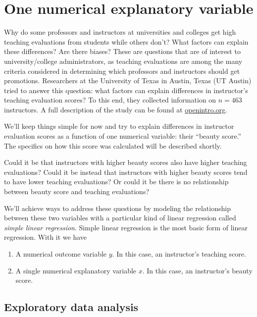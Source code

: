 \documentclass[
  letterpaper,
  DIV=11,
  numbers=noendperiod]{scrreprt}
\theoremstyle{definition}
\theoremstyle{remark}
\begin{document}
\hypertarget{sec-model1}{%
\section{One numerical explanatory variable}\label{sec-model1}}

Why do some professors and instructors at universities and colleges get
high teaching evaluations from students while others don't? What factors
can explain these differences? Are there biases? These are questions
that are of interest to university/college administrators, as teaching
evaluations are among the many criteria considered in determining which
professors and instructors should get promotions. Researchers at the
University of Texas in Austin, Texas (UT Austin) tried to answer this
question: what factors can explain differences in instructor's teaching
evaluation scores? To this end, they collected information on
\(n = 463\) instructors. A full description of the study can be found at
\href{https://www.openintro.org/stat/data/?data=evals}{openintro.org}.

We'll keep things simple for now and try to explain differences in
instructor evaluation scores as a function of one numerical variable:
their ``beauty score.'' The specifics on how this score was calculated
will be described shortly.

Could it be that instructors with higher beauty scores also have higher
teaching evaluations? Could it be instead that instructors with higher
beauty scores tend to have lower teaching evaluations? Or could it be
there is no relationship between beauty score and teaching evaluations?

We'll achieve ways to address these questions by modeling the
relationship between these two variables with a particular kind of
linear regression called \emph{simple linear regression}. Simple linear
regression is the most basic form of linear regression. With it we have

\begin{enumerate}
\def\labelenumi{\arabic{enumi}.}
\item
  A numerical outcome variable \(y\). In this case, an instructor's
  teaching score.
\item
  A single numerical explanatory variable \(x\). In this case, an
  instructor's beauty score.
\end{enumerate}

\hypertarget{sec-model1EDA}{%
\subsection{Exploratory data analysis}\label{sec-model1EDA}}
\end{document}
